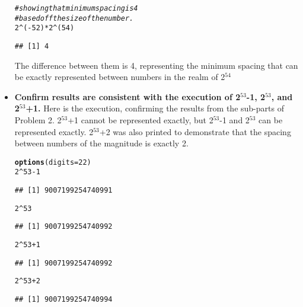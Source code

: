 \documentclass{article}\usepackage[]{graphicx}\usepackage[]{color}
\makeatletter
\newcommand{\hlnum}[1]{\textcolor[rgb]{0.686,0.059,0.569}{#1}}%
\newcommand{\hlcom}[1]{\textcolor[rgb]{0.678,0.584,0.686}{\textit{#1}}}%
\newcommand{\hlopt}[1]{\textcolor[rgb]{0,0,0}{#1}}%
\newcommand{\hlstd}[1]{\textcolor[rgb]{0.345,0.345,0.345}{#1}}%
\newcommand{\hlkwc}[1]{\textcolor[rgb]{0.333,0.667,0.333}{#1}}%
\newcommand{\hlkwd}[1]{\textcolor[rgb]{0.737,0.353,0.396}{\textbf{#1}}}%
\newenvironment{kframe}{%
 \def\at@end@of@kframe{}%
 \ifinner\ifhmode%
  \def\at@end@of@kframe{\end{minipage}}%
  \begin{minipage}{\columnwidth}%
 \fi\fi%
 \def\FrameCommand##1{\hskip\@totalleftmargin \hskip-\fboxsep
 \colorbox{shadecolor}{##1}\hskip-\fboxsep
     \hskip-\linewidth \hskip-\@totalleftmargin \hskip\columnwidth}%
 \MakeFramed {\advance\hsize-\width
   \@totalleftmargin\z@ \linewidth\hsize
   \@setminipage}}%
 {\par\unskip\endMakeFramed%
 \at@end@of@kframe}
\newenvironment{knitrout}{}{} %
\makeatother
\begin{document}
\begin{itemize}
\begin{knitrout}
\color{fgcolor}\begin{kframe}
\begin{alltt}
\hlcom{#showing that minimum spacing is 4}
\hlcom{#based off the size of the number.}
\hlnum{2}\hlopt{^}\hlstd{(}\hlopt{-}\hlnum{52}\hlstd{)}\hlopt{*}\hlnum{2}\hlopt{^}\hlstd{(}\hlnum{54}\hlstd{)}
\end{alltt}
\begin{verbatim}
## [1] 4
\end{verbatim}
\end{kframe}
\end{knitrout}
The difference between them is 4, representing the minimum spacing that can be exactly represented between numbers in the realm of 2$^{54}$
\item \textbf{Confirm results are consistent with the execution of 2$^{53}$-1, 2$^{53}$, and 2$^{53}$+1.}
\subitem Here is the execution, confirming the results from the sub-parts of Problem 2.  2$^{53}$+1 cannot be represented exactly, but 2$^{53}$-1 and 2$^{53}$ can be represented exactly.  2$^{53}$+2 was also printed to demonstrate that the spacing between numbers of the magnitude is exactly 2.
\begin{knitrout}
\color{fgcolor}\begin{kframe}
\begin{alltt}
\hlkwd{options}\hlstd{(}\hlkwc{digits}\hlstd{=}\hlnum{22}\hlstd{)}
\hlnum{2}\hlopt{^}\hlnum{53}\hlopt{-}\hlnum{1}
\end{alltt}
\begin{verbatim}
## [1] 9007199254740991
\end{verbatim}
\begin{alltt}
\hlnum{2}\hlopt{^}\hlnum{53}
\end{alltt}
\begin{verbatim}
## [1] 9007199254740992
\end{verbatim}
\begin{alltt}
\hlnum{2}\hlopt{^}\hlnum{53}\hlopt{+}\hlnum{1}
\end{alltt}
\begin{verbatim}
## [1] 9007199254740992
\end{verbatim}
\begin{alltt}
\hlnum{2}\hlopt{^}\hlnum{53}\hlopt{+}\hlnum{2}
\end{alltt}
\begin{verbatim}
## [1] 9007199254740994
\end{verbatim}
\end{kframe}
\end{knitrout}
\end{itemize}
\end{document}
